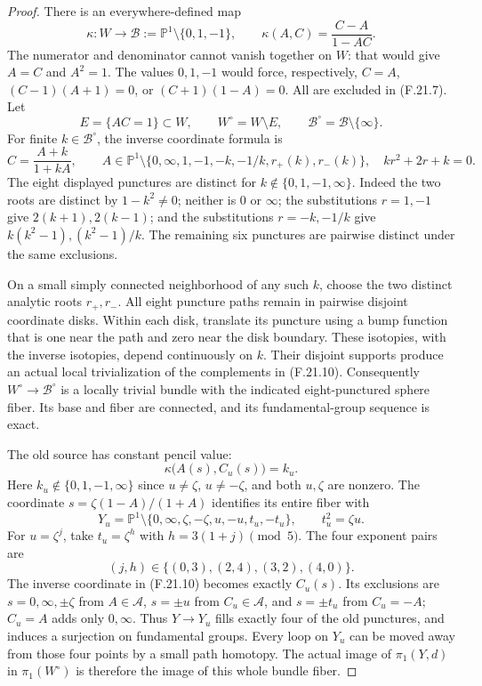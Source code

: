\begin{proof}
There is an everywhere-defined map
\[
 \kappa:W\longrightarrow
        \mathscr B:=\mathbb P^1\setminus\{0,1,-1\},
       \qquad \kappa(A,C)=\frac{C-A}{1-AC}.
                                                               \tag{F.21.8}
\]
The numerator and denominator cannot vanish together on
$W$: that would give $A=C$ and $A^2=1$.
The values $0,1,-1$ would force, respectively,
$C=A$, $(C-1)(A+1)=0$, or $(C+1)(1-A)=0$.
All are excluded in (F.21.7).
Let
\[
 E=\{AC=1\}\subset W,
 \qquad W^\circ=W\setminus E,
 \qquad\mathscr B^\circ=\mathscr B\setminus\{\infty\}.
                                                               \tag{F.21.9}
\]
For finite $k\in\mathscr B^\circ$, the inverse coordinate
formula is
\[
 C=\frac{A+k}{1+kA},\qquad
 A\in\mathbb P^1\setminus
 \{0,\infty,1,-1,-k,-1/k,r_+(k),r_-(k)\},
 \quad kr^2+2r+k=0.
                                                               \tag{F.21.10}
\]
The eight displayed punctures are distinct for
$k\notin\{0,1,-1,\infty\}$.
Indeed the two roots are distinct by $1-k^2\ne0$;
neither is $0$ or $\infty$; the substitutions $r=1,-1$
give $2(k+1),2(k-1)$; and the substitutions
$r=-k,-1/k$ give $k(k^2-1),(k^2-1)/k$.
The remaining six punctures are pairwise distinct
under the same exclusions.

On a small simply connected neighborhood of any such
$k$, choose the two distinct analytic roots $r_+,r_-$.
All eight puncture paths remain in pairwise disjoint
coordinate disks. Within each disk, translate its
puncture using a bump function that is one near the
path and zero near the disk boundary. These isotopies,
with the inverse isotopies, depend continuously on $k$.
Their disjoint supports produce an actual local
trivialization of the complements in (F.21.10).
Consequently $W^\circ\to\mathscr B^\circ$ is a locally
trivial bundle with the indicated eight-punctured sphere
fiber. Its base and fiber are connected, and its
fundamental-group sequence is exact.

The old source has constant pencil value:
\[
 \kappa\bigl(A(s),C_u(s)\bigr)=k_u.
                                                               \tag{F.21.11}
\]
Here $k_u\notin\{0,1,-1,\infty\}$ since $u\ne\zeta$,
$u\ne-\zeta$, and both $u,\zeta$ are nonzero.
The coordinate $s=\zeta(1-A)/(1+A)$ identifies its
entire fiber with
\[
 Y_u=\mathbb P^1\setminus
       \{0,\infty,\zeta,-\zeta,u,-u,t_u,-t_u\},
       \qquad t_u^2=\zeta u .
                                                               \tag{F.21.12}
\]
For $u=\zeta^j$, take $t_u=\zeta^h$ with
$h=3(1+j)\pmod5$. The four exponent pairs are
\[
                 (j,h)\in\{(0,3),(2,4),(3,2),(4,0)\}.
\]
The inverse coordinate in (F.21.10) becomes exactly
$C_u(s)$. Its exclusions are $s=0,\infty,\pm\zeta$
from $A\in\mathscr A$, $s=\pm u$ from $C_u\in\mathscr A$,
and $s=\pm t_u$ from $C_u=-A$; $C_u=A$ adds only
$0,\infty$. Thus $Y\to Y_u$ fills exactly four of
the old punctures, and induces a surjection on
fundamental groups. Every loop on $Y_u$ can be moved
away from those four points by a small path homotopy.
The actual image of $\pi_1(Y,d)$ in $\pi_1(W^\circ)$
is therefore the image of this whole bundle fiber.


\end{proof}
